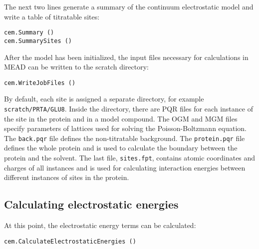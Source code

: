 \documentclass[a4paper,11pt]{article}
\begin{document}
{\bigskip
The next two lines generate a summary of the continuum electrostatic model and
write a table of titratable sites:

{\footnotesize \begin{lstlisting}
cem.Summary ()
cem.SummarySites ()
\end{lstlisting} }

\bigskip
After the model has been initialized, the input files necessary for calculations in MEAD
can be written to the scratch directory:

{\footnotesize \begin{lstlisting}
cem.WriteJobFiles ()
\end{lstlisting} }

By default, each site is assigned a separate directory, for example
\texttt{scratch/PRTA/GLU8}.
%
Inside the directory, there are PQR files for each instance of the site in the protein
and in a model compound.
%
The OGM and MGM files specify parameters of lattices used for solving the Poisson-Boltzmann equation.
%
The \texttt{back.pqr} file defines the non-titratable background.
%
The \texttt{protein.pqr} file defines the whole protein and is used to calculate the boundary
between the protein and the solvent.
%
The last file, \texttt{sites.fpt}, contains atomic coordinates and charges of all instances
and is used for calculating interaction energies between
different instances of sites in the protein.


\subsection{Calculating electrostatic energies}
At this point, the electrostatic energy terms can be calculated:

{\footnotesize \begin{lstlisting}
cem.CalculateElectrostaticEnergies ()
\end{lstlisting} }

}
\end{document}
